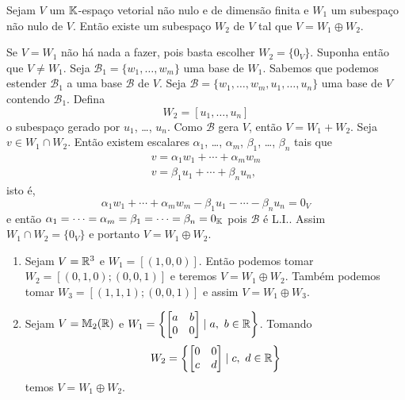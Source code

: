 \begin{proposicao}
    Sejam $V$ um $\mathbb{K}$-espa\c{c}o vetorial n\~ao nulo e de dimens\~ao finita e $W_1$ um subespa\c{c}o n\~ao nulo de $V$. Ent\~ao
    existe um subespa\c{c}o $W_2$ de $V$ tal que $V = W_1 \oplus W_2$.
\end{proposicao}
\begin{prova}
    Se $V = W_1$ n\~ao h\'a nada a fazer, pois basta escolher $W_2 = \{0_V\}$. Suponha ent\~ao que $V \ne W_1$. Seja
    $\mathcal{B}_1 = \{w_1, \dots, w_m\}$ uma base de $W_1$. Sabemos que podemos estender $\mathcal{B}_1$ a uma base
    $\mathcal{B}$ de $V$. Seja $\mathcal{B} = \{w_1, \dots, w_m, u_1, \dots, u_n\}$ uma base de $V$ contendo
    $\mathcal{B}_1$. Defina
    \[
        W_2 = [u_1, \dots, u_n]
    \]
    o subespa\c{c}o gerado por $u_1$, \dots, $u_n$. Como $\mathcal{B}$ gera $V$, ent\~ao $V = W_1 + W_2$. Seja $v \in W_1 \cap
    W_2$. Ent\~ao existem escalares $\alpha_1$, \dots, $\alpha_m$, $\beta_1$, \dots, $\beta_n$ tais que
    \begin{align*}
        v = \alpha_1w_1 + \cdots + \alpha_mw_m\\
        v = \beta_1u_1 + \cdots + \beta_nu_n,
    \end{align*}
    isto \'e,
    \[
        \alpha_1w_1 + \cdots + \alpha_mw_m - \beta_1u_1 - \cdots - \beta_nu_n = 0_V
    \]
    e ent\~ao $\alpha_1 = \dots = \alpha_m = \beta_1 = \dots = \beta_n = 0_{\mathbb{K}}$ pois $\mathcal{B}$ \'e L.I.. Assim $W_1
    \cap W_2 = \{0_V\}$ e portanto $V = W_1 \oplus W_2$.
\end{prova}

\begin{exemplo}
    \begin{enumerate}[label={\arabic*})]
        \item Sejam $V = \mathbb{R}^3$ e $W_1 = [(1,0,0)]$. Ent\~ao podemos tomar $W_2 = [(0,1,0); (0,0,1)]$ e teremos $V = W_1 \oplus W_2$. Tamb\'em podemos tomar $W_3 = [(1,1,1); (0,0,1)]$ e assim $V = W_1
        \oplus W_3$.
        \item Sejam $V = \mathbb{M}_2(\mathbb{R})$ e $W_1 = \left\{\begin{bmatrix}
            a & b\\ 0 & 0
        \end{bmatrix} \mid a,\ b \in \mathbb{R}\right\}$. Tomando
        \[
            W_2 = \left\{\begin{bmatrix}
            0 & 0\\ c & d
        \end{bmatrix} \mid c,\ d \in \mathbb{R}\right\}
        \]
        temos $V = W_1 \oplus W_2$.
    \end{enumerate}
\end{exemplo}

